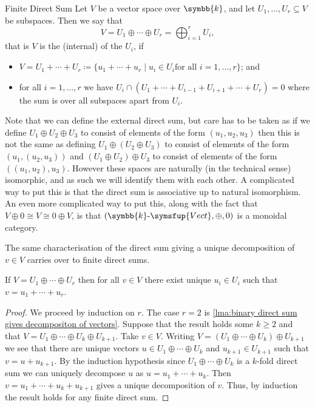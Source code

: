 \documentclass[fleqn]{NotesClass}
\makeatletter
\renewcommand{\field}{\symbb{k}}
\newcommand{\c@egory}[1]{\symsfup{#1}}
\newcommand{\Vect}[1][\field]{#1\text{-}\c@egory{Vect}}
\newcommand{\isomorphic}{\cong}
\makeatother
\begin{document}
    \begin{dfn}{Finite Direct Sum}{}
        Let \(V\) be a vector space over \(\field\), and let \(U_1, \dotsc, U_r \subseteq V\) be subspaces.
        Then we say that
        \begin{equation}
            V = U_1 \oplus \dotsb \oplus U_r = \bigoplus_{i=1}^r U_i,
        \end{equation}
        that is \(V\) is the (internal)  of the \(U_i\), if
        \begin{itemize}
            \item \(V = U_1 + \dotsb + U_r \coloneq \{u_1 + \dotsb + u_r \mid u_i \in U_i \text{for all } i = 1, \dotsc, r\}\); and
            \item for all \(i = 1, \dotsc, r\) we have \(U_i \cap (U_1 + \dotsb + U_{i-1} + U_{i+1} + \dotsb + U_r) = 0\) where the sum is over all subspaces apart from \(U_i\).
        \end{itemize}
    \end{dfn}
    
    Note that we can define the external direct sum, but care has to be taken as if we define \(U_1 \oplus U_2 \oplus U_3\) to consist of elements of the form \((u_1, u_2, u_3)\) then this is not the same as defining \(U_1 \oplus (U_2 \oplus U_3)\) to consist of elements of the form \((u_1, (u_2, u_3))\) and \((U_1 \oplus U_2) \oplus U_3\) to consist of elements of the form \(((u_1, u_2), u_3)\).
    However these spaces are naturally (in the technical sense) isomorphic, and as such we will identify them with each other.
    A complicated way to put this is that the direct sum is associative up to natural isomorphism.
    An even more complicated way to put this, along with the fact that \(V \oplus 0 \isomorphic V \isomorphic 0 \oplus V\), is that \((\Vect, \oplus, 0)\) is a monoidal category.
    
    The same characterisation of the direct sum giving a unique decomposition of \(v \in V\) carries over to finite direct sums.
    
    \begin{lma}{}{}
        If \(V = U_1 \oplus \dotsb \oplus U_r\) then for all \(v \in V\) there exist unique \(u_i \in U_i\) such that \(v = u_1 + \dotsb + u_r\).
        \begin{proof}
            We proceed by induction on \(r\).
            The case \(r = 2\) is \cref{lma:binary direct sum gives decompositon of vectors}.
            Suppose that the result holds some \(k \ge 2\) and that \(V = U_1 \oplus \dotsb \oplus U_k \oplus U_{k+1}\).
            Take \(v \in V\).
            Writing \(V = (U_1 \oplus \dotsb \oplus U_k) \oplus U_{k+1}\) we see that there are unique vectors \(u \in U_1 \oplus \dotsb \oplus U_k\) and \(u_{k+1} \in U_{k+1}\) such that \(v = u + u_{k+1}\).
            By the induction hypothesis since \(U_1 \oplus \dotsb \oplus U_k\) is a \(k\)-fold direct sum we can uniquely decompose \(u\) as \(u = u_1 + \dotsb + u_k\).
            Then \(v = u_1 + \dotsb + u_k + u_{k+1}\) gives a unique decomposition of \(v\).
            Thus, by induction the result holds for any finite direct sum.
        \end{proof}
    \end{lma}
    
\end{document}
